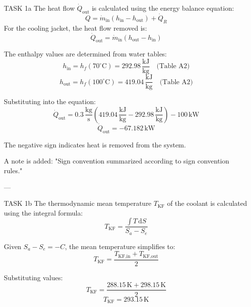 TASK 1a  
The heat flow \( \dot{Q}_{\text{out}} \) is calculated using the energy balance equation:  
\[
Q = \dot{m}_{\text{in}} (h_{\text{in}} - h_{\text{out}}) + \dot{Q}_R
\]  
For the cooling jacket, the heat flow removed is:  
\[
\dot{Q}_{\text{out}} = \dot{m}_{\text{in}} (h_{\text{out}} - h_{\text{in}})
\]  

The enthalpy values are determined from water tables:  
\[
h_{\text{in}} = h_f(70^\circ\text{C}) = 292.98 \, \frac{\text{kJ}}{\text{kg}} \quad \text{(Table A2)}
\]  
\[
h_{\text{out}} = h_f(100^\circ\text{C}) = 419.04 \, \frac{\text{kJ}}{\text{kg}} \quad \text{(Table A2)}
\]  

Substituting into the equation:  
\[
\dot{Q}_{\text{out}} = 0.3 \, \frac{\text{kg}}{\text{s}} \left( 419.04 \, \frac{\text{kJ}}{\text{kg}} - 292.98 \, \frac{\text{kJ}}{\text{kg}} \right) - 100 \, \text{kW}
\]  
\[
\dot{Q}_{\text{out}} = -67.182 \, \text{kW}
\]  

The negative sign indicates heat is removed from the system.  

A note is added: "Sign convention summarized according to sign convention rules."  

---

TASK 1b  
The thermodynamic mean temperature \( T_{\text{KF}} \) of the coolant is calculated using the integral formula:  
\[
T_{\text{KF}} = \frac{\int T \, \text{d}S}{S_a - S_e}
\]  

Given \( S_a - S_e = -C \), the mean temperature simplifies to:  
\[
T_{\text{KF}} = \frac{T_{\text{KF,in}} + T_{\text{KF,out}}}{2}
\]  

Substituting values:  
\[
T_{\text{KF}} = \frac{288.15 \, \text{K} + 298.15 \, \text{K}}{2}
\]  
\[
T_{\text{KF}} = 293.15 \, \text{K}
\]